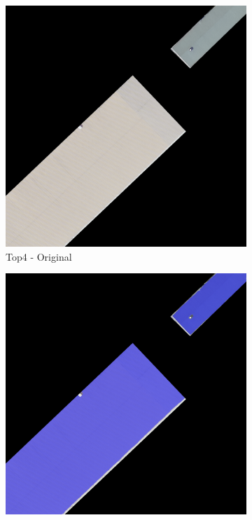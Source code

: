 \begin{figure}[H]
\begin{subfigure}{0.32\textwidth}
    \includegraphics[width=\textwidth]{02-main//figures/ch4/kfold_ensembles/segformer_tu-mambaout_base/best_cases/best_2_iou0.983_24961121_tile_15_10_cc6553_original.png}
    \caption{Top4 - Original}
\end{subfigure}
\hfill
\begin{subfigure}{0.32\textwidth}
    \includegraphics[width=\textwidth]{02-main//figures/ch4/kfold_ensembles/segformer_tu-mambaout_base/best_cases/best_2_iou0.983_24961121_tile_15_10_cc6553_overlay_gt.png}

\end{subfigure}
\end{figure}
